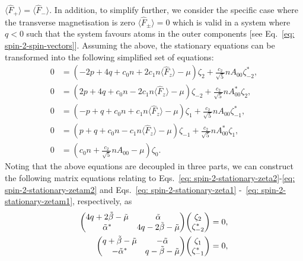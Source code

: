 \(\langle\hat{F}_+\rangle = \langle\hat{F}_-\rangle\).
In addition, to simplify further, we consider the specific case where the
transverse magnetisation is zero \(\langle\hat{F}_{\pm}\rangle = 0\) which is
valid in a system where \(q < 0\) such that the system favours atoms in the
outer components [see Eq.~\eqref{eq: spin-2-spin-vectors}].
Assuming the above, the stationary equations can be transformed into the
following simplified set of equations:
\begin{align}
    0 & = (-2p + 4q + c_0n + 2c_1n\langle\hat{F}_z\rangle - \mu)\zeta_2
    + \frac{c_2}{\sqrt{5}}nA_{00}\zeta^*_{-2},
    \label{eq: spin-2-stationary-zeta2}                                 \\
    0 & = (2p + 4q + c_0n - 2c_1n\langle\hat{F}_z\rangle - \mu)\zeta_{-2}
    + \frac{c_2}{\sqrt{5}}nA^*_{00}\zeta_{2},
    \label{eq: spin-2-stationary-zetam2}                                \\
    0 & = (-p + q + c_0n + c_1n\langle\hat{F}_z\rangle - \mu)\zeta_1
    + \frac{c_2}{\sqrt{5}}nA_{00}\zeta^*_{-1},
    \label{eq: spin-2-stationary-zeta1}                                 \\
    0 & = (p + q + c_0n - c_1n\langle\hat{F}_z\rangle - \mu)\zeta_{-1}
    + \frac{c_2}{\sqrt{5}}nA^*_{00}\zeta_1,
    \label{eq: spin-2-stationary-zetam1}                                \\
    0 & = \left(c_0n + \frac{c_2}{\sqrt{5}}nA_{00} - \mu\right)\zeta_0.
    \label{eq: spin-2-stationary-zeta0}
\end{align}
Noting that the above equations are decoupled in three parts, we can construct
the following matrix equations relating to
Eqs.~\eqref{eq: spin-2-stationary-zeta2}-\eqref{eq: spin-2-stationary-zetam2}
and Eqs.~\eqref{eq: spin-2-stationary-zeta1}
-~\eqref{eq: spin-2-stationary-zetam1}, respectively, as
\begin{align}
    \mqty(4q + 2\tilde{\beta} -\tilde{\mu} & \tilde{\alpha} \\
    \tilde{\alpha}^*               & 4q - 2\tilde{\beta} -\tilde{\mu})
    \mqty(\zeta_2                                                      \\
    \zeta_{-2}^*)                  & = 0, \label{eq: zeta-pm2-matrix}  \\
    \mqty(q + \tilde{\beta} -\tilde{\mu}   & -\tilde{\alpha} \\
    -\tilde{\alpha}^*              & q - \tilde{\beta} -\tilde{\mu})
    \mqty(\zeta_1                                                      \\
    \zeta_{-1}^*)                  & = 0, \label{eq: zeta-pm1-matrix}
\end{align}
